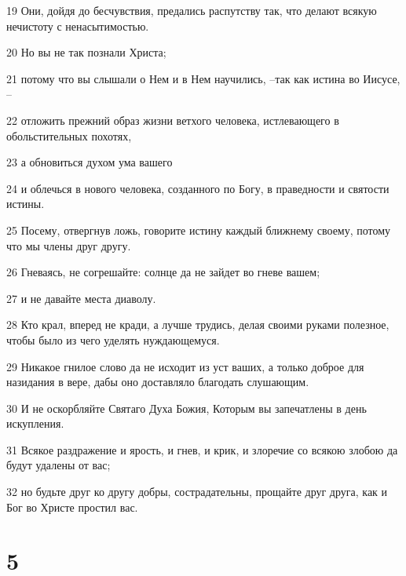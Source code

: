 \par 19 Они, дойдя до бесчувствия, предались распутству так, что делают всякую нечистоту с ненасытимостью.
\par 20 Но вы не так познали Христа;
\par 21 потому что вы слышали о Нем и в Нем научились, --так как истина во Иисусе, --
\par 22 отложить прежний образ жизни ветхого человека, истлевающего в обольстительных похотях,
\par 23 а обновиться духом ума вашего
\par 24 и облечься в нового человека, созданного по Богу, в праведности и святости истины.
\par 25 Посему, отвергнув ложь, говорите истину каждый ближнему своему, потому что мы члены друг другу.
\par 26 Гневаясь, не согрешайте: солнце да не зайдет во гневе вашем;
\par 27 и не давайте места диаволу.
\par 28 Кто крал, вперед не кради, а лучше трудись, делая своими руками полезное, чтобы было из чего уделять нуждающемуся.
\par 29 Никакое гнилое слово да не исходит из уст ваших, а только доброе для назидания в вере, дабы оно доставляло благодать слушающим.
\par 30 И не оскорбляйте Святаго Духа Божия, Которым вы запечатлены в день искупления.
\par 31 Всякое раздражение и ярость, и гнев, и крик, и злоречие со всякою злобою да будут удалены от вас;
\par 32 но будьте друг ко другу добры, сострадательны, прощайте друг друга, как и Бог во Христе простил вас.

\chapter{5}

